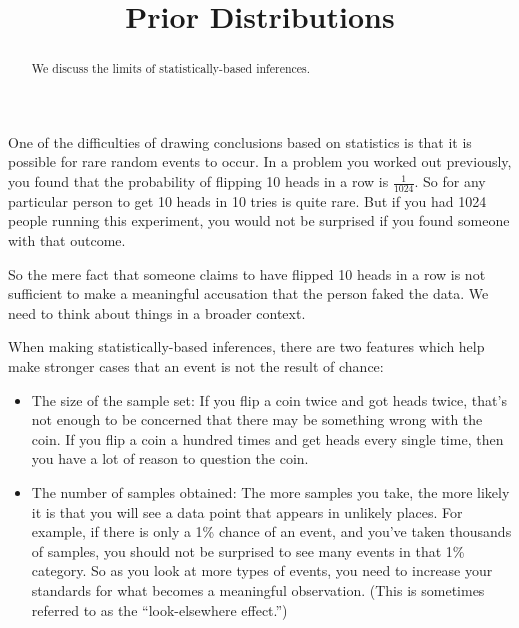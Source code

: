 \documentclass{ximera}
\title{Prior Distributions}
\begin{document}
\begin{abstract}
We discuss the limits of statistically-based inferences.
\end{abstract}
\maketitle

One of the difficulties of drawing conclusions based on statistics is that it is possible for rare random events to occur. In a problem you worked out previously, you found that the probability of flipping 10 heads in a row is $\frac{1}{1024}$. So for any particular person to get 10 heads in 10 tries is quite rare. But if you had 1024 people running this experiment, you would not be surprised if you found someone with that outcome.

So the mere fact that someone claims to have flipped 10 heads in a row is not sufficient to make a meaningful accusation that the person faked the data. We need to think about things in a broader context.

When making statistically-based inferences, there are two features which help make stronger cases that an event is not the result of chance:
\begin{itemize}
  \item The size of the sample set: If you flip a coin twice and got heads twice, that's not enough to be concerned that there may be something wrong with the coin. If you flip a coin a hundred times and get heads every single time, then you have a lot of reason to question the coin.
  \item The number of samples obtained: The more samples you take, the more likely it is that you will see a data point that appears in unlikely places. For example, if there is only a 1\% chance of an event, and you've taken thousands of samples, you should not be surprised to see many events in that 1\% category. So as you look at more types of events, you need to increase your standards for what becomes a meaningful observation. (This is sometimes referred to as the ``look-elsewhere effect.'')
\end{itemize}
\end{document}
